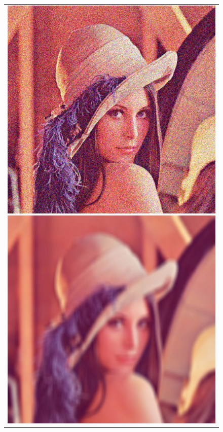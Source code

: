 \documentclass{article}
\begin{document}
\begin{figure}[ht]
\begin{center}
	\begin{tabular}{c}	
		\includegraphics[scale=0.28]{images/lena_noisy.jpg}
		\includegraphics[scale=0.28]{images/lena_blurred.jpg}

\end{tabular}
\end{center}
\end{figure}
\end{document}
